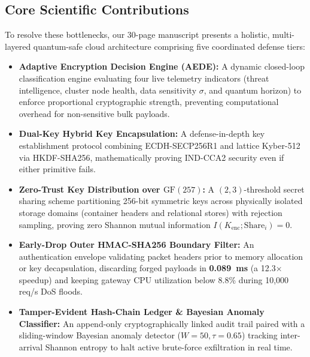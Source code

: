 \documentclass[11pt,a4paper]{article}
\begin{document}
\subsection*{Core Scientific Contributions}
To resolve these bottlenecks, our 30-page manuscript presents a holistic, multi-layered quantum-safe cloud architecture comprising five coordinated defense tiers:
\begin{itemize}
    \item \textbf{Adaptive Encryption Decision Engine (AEDE):} A dynamic closed-loop classification engine evaluating four live telemetry indicators (threat intelligence, cluster node health, data sensitivity $\sigma$, and quantum horizon) to enforce proportional cryptographic strength, preventing computational overhead for non-sensitive bulk payloads.
    \item \textbf{Dual-Key Hybrid Key Encapsulation:} A defense-in-depth key establishment protocol combining ECDH-SECP256R1 and lattice Kyber-512 via HKDF-SHA256, mathematically proving IND-CCA2 security even if either primitive fails.
    \item \textbf{Zero-Trust Key Distribution over $\text{GF}(257)$:} A $(2,3)$-threshold secret sharing scheme partitioning 256-bit symmetric keys across physically isolated storage domains (container headers and relational stores) with rejection sampling, proving zero Shannon mutual information $I(K_{\text{enc}}; \text{Share}_i) = 0$.
    \item \textbf{Early-Drop Outer HMAC-SHA256 Boundary Filter:} An authentication envelope validating packet headers prior to memory allocation or key decapsulation, discarding forged payloads in \textbf{0.089~ms} (a 12.3$\times$ speedup) and keeping gateway CPU utilization below 8.8\% during 10,000 req/s DoS floods.
    \item \textbf{Tamper-Evident Hash-Chain Ledger \& Bayesian Anomaly Classifier:} An append-only cryptographically linked audit trail paired with a sliding-window Bayesian anomaly detector ($W=50, \tau=0.65$) tracking inter-arrival Shannon entropy to halt active brute-force exfiltration in real time.
\end{itemize}
\end{document}
